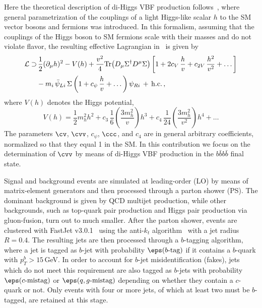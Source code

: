 Here the theoretical description of di-Higgs VBF production follows~\cite{Contino:2010mh}, where general parametrization of the
couplings of a light Higgs-like scalar $h$ to the SM vector bosons and fermions
was introduced.
%
In this formalism, assuming that the couplings of the Higgs boson to SM fermions scale with their masses and
do not violate flavor, the resulting effective Lagrangian in~\cite{Contino:2010mh}
is given by
\begin{equation}
\label{eq:lagrangian}
\begin{split}
{\cal L}  \supset
 & \, \frac{1}{2}(\partial_\mu h)^2 - V(h) +\frac{v^2}{4}{\rm Tr}\!\left (D_\mu \Sigma^\dagger D^\mu \Sigma\right )
    \left [ 1+2c_V\, \frac{h}{v}+c_{2V}\,\frac{h^2}{v^2}+\dots\right ] \\
 &-m_i\,\bar \psi_{Li}\, \Sigma\left (1+c_{\psi}\,\frac{h}{v} + \dots \right)\psi_{Ri}\,+\,{\rm h.c.}\, ,
\end{split}
\end{equation}
%
where $V(h)$ denotes the Higgs potential, 
%
\begin{equation}
\label{eq:potential}
V(h) = \frac{1}{2} m_h^2 h^2 + c_3\, \frac{1}{6} \left( \frac{3m_h^2}{v} \right) h^3 + c_4\, \frac{1}{24} \left( \frac{3m_h^2}{v^2} \right) h^4 + \dots
\end{equation}
%
The parameters $\cv$, $\cvv$, $c_{\psi}$, $\ccc$, and $c_4$ are in general
arbitrary coefficients, normalized so that they equal 1 in the SM.
%
In this contribution we focus on the determination of $\cvv$ by means
of di-Higgs VBF production in the $b\bar{b}b\bar{b}$ final state.


Signal and background events are simulated at leading-order (LO) by means of
matrix-element  generators and then processed through a parton shower (PS).
%
The dominant background is given by QCD multijet production,
while other backgrounds, such as top-quark pair production and 
Higgs pair production via
gluon-fusion, turn out to much smaller.
%
After the parton shower, events are clustered with 
{\sc\small FastJet} v3.0.1~\cite{Cacciari:2011ma} using the
anti-$k_t$ algorithm~\cite{Cacciari:2008gp} with a jet radius $R=0.4$.
%
The resulting jets are then processed through a $b$-tagging algorithm,
where a jet is tagged as $b$-jet with probability $\eps(b\text{-tag})$ 
if it contains a $b$-quark with $p_T^b > 15\,$GeV.
%
In order to account for $b$-jet misidentification (fakes),
jets which do not meet this requirement
are also tagged as $b$-jets with probability $\eps(c\text{-mistag})$ or $\eps(q,g\text{-mistag})$
depending on whether they contain a $c$-quark or not.
%
Only events with four or more jets, of which at least two
must be $b$-tagged, are retained at this stage.


